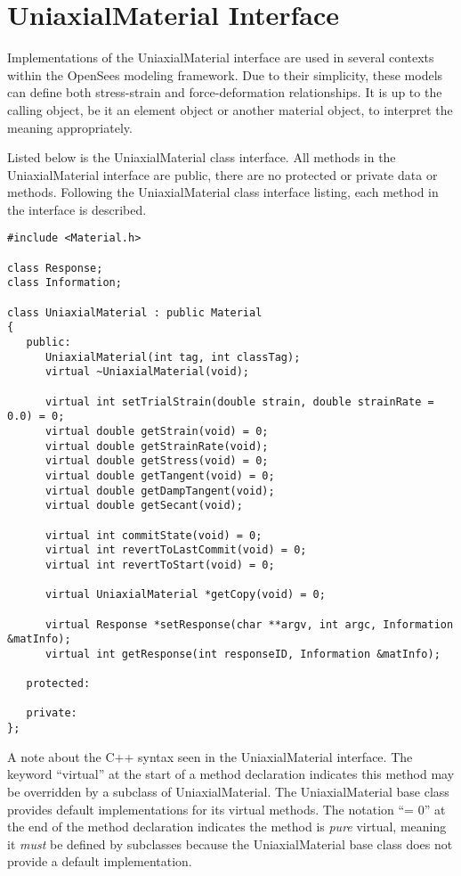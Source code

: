 \documentclass[12pt]{article}
\begin{document}
\section{UniaxialMaterial Interface}
Implementations of the UniaxialMaterial interface are used in several contexts within
the OpenSees modeling framework. Due to their simplicity, these models can define both
stress-strain and force-deformation relationships. It is up to the calling object, be
it an element object or another material object, to interpret the meaning appropriately.

Listed below is the UniaxialMaterial class interface.
All methods in the UniaxialMaterial interface are public, there are no protected or
private data or methods.
Following the UniaxialMaterial class interface listing, each method in the interface is
described.

{\sf\small
\begin{verbatim}
#include <Material.h>

class Response;
class Information;

class UniaxialMaterial : public Material
{
   public:
      UniaxialMaterial(int tag, int classTag);    
      virtual ~UniaxialMaterial(void);

      virtual int setTrialStrain(double strain, double strainRate = 0.0) = 0;
      virtual double getStrain(void) = 0;
      virtual double getStrainRate(void);
      virtual double getStress(void) = 0;
      virtual double getTangent(void) = 0;
      virtual double getDampTangent(void);
      virtual double getSecant(void);

      virtual int commitState(void) = 0;
      virtual int revertToLastCommit(void) = 0;    
      virtual int revertToStart(void) = 0;        

      virtual UniaxialMaterial *getCopy(void) = 0;

      virtual Response *setResponse(char **argv, int argc, Information &matInfo);
      virtual int getResponse(int responseID, Information &matInfo);    

   protected:
    
   private:
};
\end{verbatim}
}

A note about the C++ syntax seen in the UniaxialMaterial interface. The keyword
``virtual'' at the start of a method declaration indicates this method may be
overridden by a subclass of UniaxialMaterial. The UniaxialMaterial base class
provides default implementations for its virtual methods. The notation ``= 0'' at the end of
the method declaration indicates the method is {\em pure} virtual, meaning it
{\em must} be defined by subclasses because the UniaxialMaterial base class does
not provide a default implementation.
\end{document}
